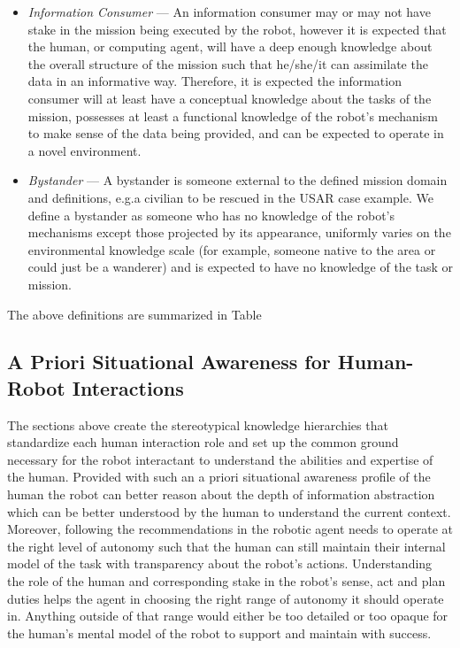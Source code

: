 \documentclass[letterpaper, 10 pt, conference]{ieeeconf} %
\theoremstyle{definition} \newtheorem{definition}{Definition}
\newcommand{\towrite}[1]{\todo[color=blue!40!white]{#1}}
\begin{document}
\begin{itemize}{}
  \item \textit{Information Consumer} --- An information consumer may or may not
        have stake in the mission being executed by the robot, however it is
        expected that the human, or computing agent, will have a deep enough
        knowledge about the overall structure of the mission such that he/she/it can
        assimilate the data in an informative way. Therefore, it is expected the
        information consumer will at least have a conceptual knowledge about the
        tasks of the mission, possesses at least a functional knowledge of the
        robot's mechanism to make sense of the data being provided, and can be
        expected to operate in a novel environment.
  \item \textit{Bystander} --- A bystander is someone external to the defined
        mission domain and definitions, e.g.\@ a civilian to be rescued in the USAR
        case example. We define a bystander as someone who has no knowledge of the
        robot's mechanisms except those projected by its appearance, uniformly
        varies on the environmental knowledge scale (for example, someone native to
        the area or could just be a wanderer) and is expected to have no
        knowledge of the task or mission.
\end{itemize}

The above definitions are summarized in Table \towrite{insert a table with
  defined knowledge levels per role}

\subsection{A Priori Situational Awareness for Human-Robot Interactions}

The sections above create the stereotypical knowledge hierarchies that
standardize each human interaction role and set up the common ground necessary
for the robot interactant to understand the abilities and expertise of the
human. Provided with such an a priori situational awareness profile of the human
the robot can better reason about the depth of information abstraction which
can be better understood by the human to understand the current context.
Moreover, following the recommendations in\textcite{Beer2014toward} the robotic
agent needs to operate at the right level of autonomy such that the human can
still maintain their internal model of the task with transparency about the
robot's actions. Understanding the role of the human and corresponding stake in
the robot's sense, act and plan duties helps the agent in choosing the right
range of autonomy it should operate in. Anything outside of that range would
either be too detailed or too opaque for the human's mental model of the robot
to support and maintain with success.
\end{document}
